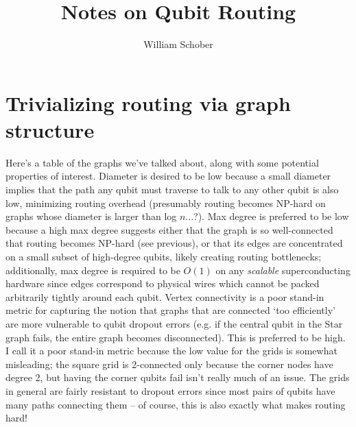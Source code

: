 \documentclass{article}
\title{Notes on Qubit Routing}
\author{William Schober}
\begin{document}
\maketitle

\section{Trivializing routing via graph structure}

Here's a table of the graphs we've talked about, along with some potential properties of interest. Diameter is desired to be low because a small diameter implies that the path any qubit must traverse to talk to any other qubit is also low, minimizing routing overhead (presumably routing becomes NP-hard on graphs whose diameter is larger than log $n$...?). Max degree is preferred to be low because a high max degree suggests either that the graph is so well-connected that routing becomes NP-hard (see previous), or that its edges are concentrated on a small subset of high-degree qubits, likely creating routing bottlenecks; additionally, max degree is required to be $O(1)$ on any \textit{scalable} superconducting hardware since edges correspond to physical wires which cannot be packed arbitrarily tightly around each qubit. Vertex connectivity is a poor stand-in metric for capturing the notion that graphs that are connected `too efficiently' are more vulnerable to qubit dropout errors (e.g. if the central qubit in the Star graph fails, the entire graph becomes disconnected). This is preferred to be high. I call it a poor stand-in metric because the low value for the grids is somewhat misleading; the square grid is 2-connected only because the corner nodes have degree 2, but having the corner qubits fail isn't really much of an issue. The grids in general are fairly resistant to dropout errors since most pairs of qubits have many paths connecting them -- of course, this is also exactly what makes routing hard!
\end{document}
